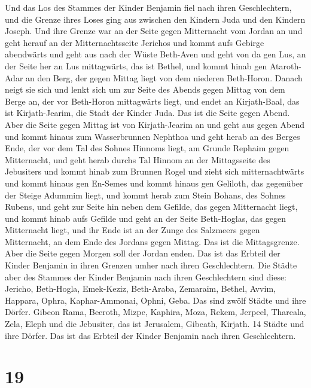  Und das Los des Stammes der Kinder Benjamin fiel nach
ihren Geschlechtern, und die Grenze ihres Loses ging aus zwischen den
Kindern Juda und den Kindern Joseph.  Und ihre Grenze war
an der Seite gegen Mitternacht vom Jordan an und geht herauf an der
Mitternachtsseite Jerichos und kommt aufs Gebirge abendwärts und geht
aus nach der Wüste Beth-Aven  und geht von da gen Lus, an
der Seite her an Lus mittagwärts, das ist Bethel, und kommt hinab gen
Ataroth-Adar an den Berg, der gegen Mittag liegt von dem niederen
Beth-Horon.  Danach neigt sie sich und lenkt sich um zur
Seite des Abends gegen Mittag von dem Berge an, der vor Beth-Horon
mittagwärts liegt, und endet an Kirjath-Baal, das ist Kirjath-Jearim,
die Stadt der Kinder Juda. Das ist die Seite gegen Abend.
 Aber die Seite gegen Mittag ist von Kirjath-Jearim an
und geht aus gegen Abend und kommt hinaus zum Wasserbrunnen Nephthoa
 und geht herab an des Berges Ende, der vor dem Tal des
Sohnes Hinnoms liegt, am Grunde Rephaim gegen Mitternacht, und geht
herab durchs Tal Hinnom an der Mittagsseite des Jebusiters und kommt
hinab zum Brunnen Rogel  und zieht sich mitternachtwärts
und kommt hinaus gen En-Semes und kommt hinaus gen Geliloth, das
gegenüber der Steige Adummim liegt, und kommt herab zum Stein Bohans,
des Sohnes Rubens,  und geht zur Seite hin neben dem
Gefilde, das gegen Mitternacht liegt, und kommt hinab aufs Gefilde
 und geht an der Seite Beth-Hoglas, das gegen Mitternacht
liegt, und ihr Ende ist an der Zunge des Salzmeers gegen Mitternacht, an
dem Ende des Jordans gegen Mittag. Das ist die Mittagsgrenze.
 Aber die Seite gegen Morgen soll der Jordan enden. Das
ist das Erbteil der Kinder Benjamin in ihren Grenzen umher nach ihren
Geschlechtern.  Die Städte aber des Stammes der Kinder
Benjamin nach ihren Geschlechtern sind diese: Jericho, Beth-Hogla,
Emek-Keziz,  Beth-Araba, Zemaraim, Bethel,
 Avvim, Happara, Ophra,  Kaphar-Ammonai,
Ophni, Geba. Das sind zwölf Städte und ihre Dörfer. 
Gibeon Rama, Beeroth,  Mizpe, Kaphira, Moza,
 Rekem, Jerpeel, Thareala,  Zela, Eleph
und die Jebusiter, das ist Jerusalem, Gibeath, Kirjath. 14 Städte und
ihre Dörfer. Das ist das Erbteil der Kinder Benjamin nach ihren
Geschlechtern.

\hypertarget{section-18}{%
\section{19}\label{section-18}}

